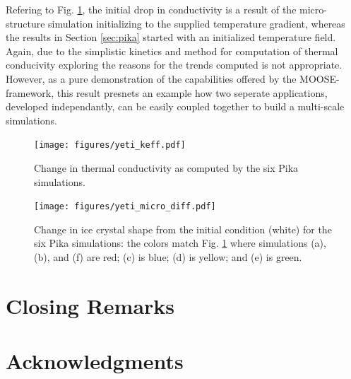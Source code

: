 Refering to Fig. \ref{fig:yeti_keff}, the initial drop in conductivity is a result of the micro-structure simulation initializing to the supplied temperature gradient, whereas the results in Section \ref{sec:pika} started with an initialized temperature field. Again, due to the simplistic kinetics and method for computation of thermal conducivity exploring the reasons for the trends computed is not appropriate. However, as a pure demonstration of the capabilities offered by the MOOSE-framework, this result presnets an example how two seperate applications, developed independantly, can be easily coupled together to build a multi-scale simulations.

\begin{figure}[H]
  \texttt{[image: figures/yeti\_keff.pdf]}
  \caption{Change in thermal conductivity as computed by the six Pika simulations.}
  \label{fig:yeti_keff}
\end{figure}


\begin{figure}
  \texttt{[image: figures/yeti\_micro\_diff.pdf]}
  \caption{Change in ice crystal shape from the initial condition (white) for the six Pika simulations: the colors match Fig. \ref{fig:yeti_keff} where simulations (a), (b), and (f) are red; (c) is blue; (d) is yellow; and (e) is green.}
  \label{fig:yeti_micro}
\end{figure}




\section{Closing Remarks}

\section{Acknowledgments}
